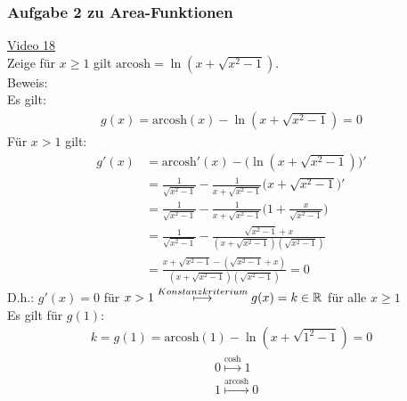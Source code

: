 \subsubsection{Aufgabe 2 zu Area-Funktionen}
\href{https://youtu.be/y-3Ng9HCIEo}{Video 18}\\
Zeige für $ x\geq 1 $ gilt $\mathrm{arcosh}=\ln(x+\sqrt{x^2-1})$.\\
Beweis:\\
Es gilt:\\
\begin{align*}
g(x)=\mathrm{arcosh}(x)-\ln(x+\sqrt{x^2-1})=0
\end{align*}
Für $ x>1 $ gilt:
\begin{align*}
g'(x)&=\mathrm{arcosh}'(x)-\big(\ln(x+\sqrt{x^2-1})\big)'\\
&=\frac{1}{\sqrt{x^2-1}}-\frac{1}{x+\sqrt{x^2-1}}\big(x+\sqrt{x^2-1}\big)'\\
&=\frac{1}{\sqrt{x^2-1}}-\frac{1}{x+\sqrt{x^2-1}}\bigg(1+\frac{x}{\sqrt{x^2-1}}\bigg)\\
&=\frac{1}{\sqrt{x^2-1}}-\frac{\sqrt{x^2-1}+x}{(x+\sqrt{x^2-1})(\sqrt{x^2-1})}\\
&=\frac{x+\sqrt{x^2-1}-(\sqrt{x^2-1}+x)}{(x+\sqrt{x^2-1})(\sqrt{x^2-1})}=0
\end{align*}
D.h.: $ g'(x)=0 $ für $ x>1 \overset{\tiny Konstanzkriterium}{\longmapsto} g(x)=k\in\mathbb{R} $ für alle $ x \geq 1 $\\
Es gilt für $ g(1) $:\\
\begin{align*}
k=g(1)=\mathrm{arcosh}(1)-\ln(x+\sqrt{1^2-1})=0
\end{align*}
\begin{align*}
&0\overset{\mathrm{cosh}}{\longmapsto} 1\\
&1\overset{\mathrm{arcosh}}{\longmapsto} 0\\
\end{align*}
